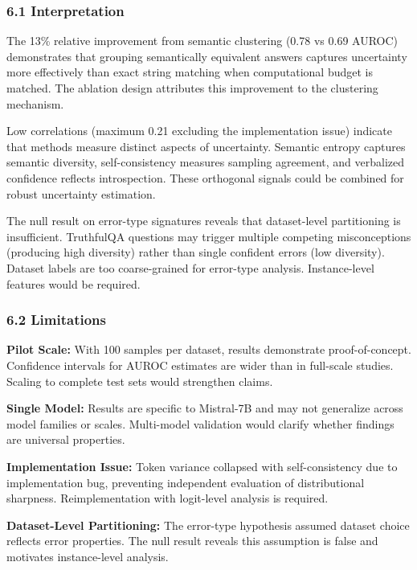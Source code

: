 
\subsubsection{6.1 Interpretation}

The 13\% relative improvement from semantic clustering (0.78 vs 0.69 AUROC) demonstrates that grouping semantically equivalent answers captures uncertainty more effectively than exact string matching when computational budget is matched. The ablation design attributes this improvement to the clustering mechanism.

Low correlations (maximum 0.21 excluding the implementation issue) indicate that methods measure distinct aspects of uncertainty. Semantic entropy captures semantic diversity, self-consistency measures sampling agreement, and verbalized confidence reflects introspection. These orthogonal signals could be combined for robust uncertainty estimation.

The null result on error-type signatures reveals that dataset-level partitioning is insufficient. TruthfulQA questions may trigger multiple competing misconceptions (producing high diversity) rather than single confident errors (low diversity). Dataset labels are too coarse-grained for error-type analysis. Instance-level features would be required.

\subsubsection{6.2 Limitations}

\textbf{Pilot Scale:} With 100 samples per dataset, results demonstrate proof-of-concept. Confidence intervals for AUROC estimates are wider than in full-scale studies. Scaling to complete test sets would strengthen claims.

\textbf{Single Model:} Results are specific to Mistral-7B and may not generalize across model families or scales. Multi-model validation would clarify whether findings are universal properties.

\textbf{Implementation Issue:} Token variance collapsed with self-consistency due to implementation bug, preventing independent evaluation of distributional sharpness. Reimplementation with logit-level analysis is required.

\textbf{Dataset-Level Partitioning:} The error-type hypothesis assumed dataset choice reflects error properties. The null result reveals this assumption is false and motivates instance-level analysis.

